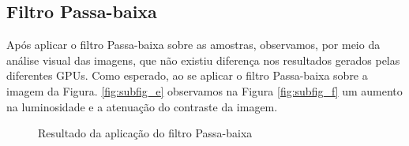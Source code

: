\FloatBarrier
\subsection{Filtro Passa-baixa}
Após aplicar o filtro Passa-baixa sobre as amostras, observamos, por meio da análise visual das imagens, que não existiu diferença nos resultados gerados pelas diferentes GPUs. Como esperado, ao se aplicar o filtro Passa-baixa sobre a imagem da Figura. \ref{fig:subfig_e} observamos na Figura \ref{fig:subfig_f} um aumento na luminosidade e a atenuação do contraste da imagem.     
\begin{figure}[!ht]
\centering
{}
\label{fig:passa_baixa}
\caption{Resultado da aplicação do filtro Passa-baixa}
\end{figure}
\FloatBarrier
